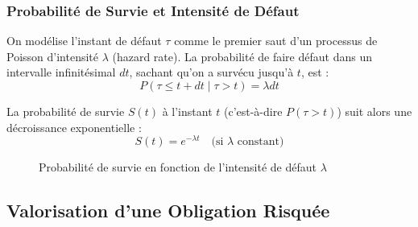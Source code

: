 \subsubsection{Probabilité de Survie et Intensité de Défaut}

On modélise l'instant de défaut $\tau$ comme le premier saut d'un processus de Poisson d'intensité $\lambda$ (hazard rate).
La probabilité de faire défaut dans un intervalle infinitésimal $dt$, sachant qu'on a survécu jusqu'à $t$, est :
\begin{equation}
    P(\tau \le t + dt \mid \tau > t) = \lambda dt
\end{equation}

La probabilité de survie $S(t)$ à l'instant $t$ (c'est-à-dire $P(\tau > t)$) suit alors une décroissance exponentielle :
\begin{equation}
    S(t) = e^{-\lambda t} \quad \text{(si } \lambda \text{ constant)}
\end{equation}

\begin{figure}[H]
    \centering
    \caption{Probabilité de survie en fonction de l'intensité de défaut $\lambda$}
\end{figure}

\subsection{Valorisation d'une Obligation Risquée}

